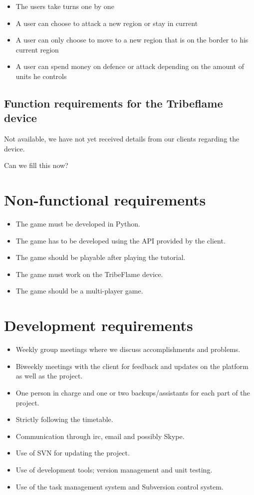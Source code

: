 \documentclass[12pt,a4paper]{article}
\begin{document}
\begin{itemize}
\item The users take turns one by one
\item A user can choose to attack a new region or stay in current
\item A user can only choose to move to a new region that is on the
  border to his current region
\item A user can spend money on defence or attack depending on the
  amount of units he controls
\end{itemize}

\subsection{Function requirements for the Tribeflame device}

Not available, we have not yet received details from our clients
regarding the device.

\begin{todo}
  Can we fill this now?
\end{todo}

\section{Non-functional requirements}

\begin{itemize}
\item The game must be developed in Python.
\item The game has to be developed using the API provided by the client.
\item The game should be playable after playing the tutorial.
\item The game must work on the TribeFlame device.
\item The game should be a multi-player game.
\end{itemize}

\section{Development requirements}

\begin{itemize}
\item Weekly group meetings where we discuss accomplishments and problems.
\item Biweekly meetings with the client for feedback and updates on
  the platform as well as the project.
\item One person in charge and one or two backups/assistants for each
  part of the project.
\item Strictly following the timetable.
\item Communication through irc, email and possibly Skype.
\item Use of SVN for updating the project.
\item Use of development tools; version management and unit testing.
\item Use of the task management system and Subversion control system.
\end{itemize}
\end{document}
